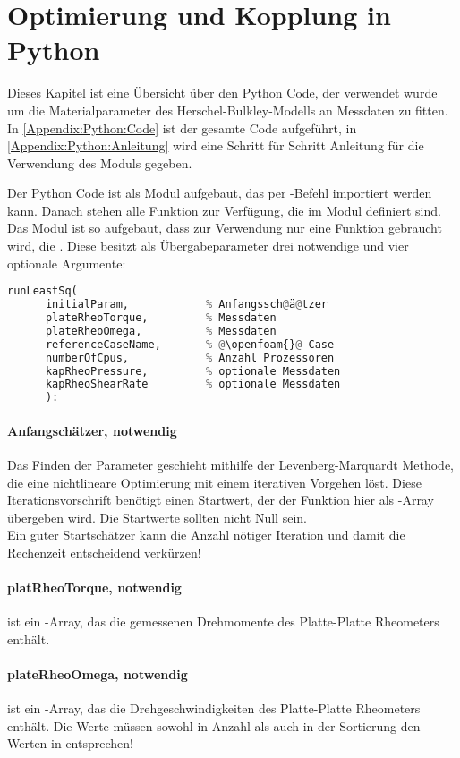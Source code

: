 \section{Optimierung und Kopplung in Python}
\label{Appendix:Python}
Dieses Kapitel ist eine Übersicht über den Python Code, der verwendet wurde um die Materialparameter des Herschel-Bulkley-Modells an Messdaten zu fitten.
In \ref{Appendix:Python:Code} ist der gesamte Code aufgeführt, in \ref{Appendix:Python:Anleitung} wird eine Schritt für Schritt Anleitung für die Verwendung des Moduls gegeben.

Der Python Code ist als Modul aufgebaut, das per -Befehl importiert werden kann.
Danach stehen alle Funktion zur Verfügung, die im Modul definiert sind.
Das Modul ist so aufgebaut, dass zur Verwendung nur eine Funktion gebraucht wird, die .
Diese besitzt als Übergabeparameter drei notwendige und vier optionale Argumente:
\begin{lstlisting}[language=Python]
runLeastSq(
      initialParam,            % Anfangssch@ä@tzer
      plateRheoTorque,         % Messdaten
      plateRheoOmega,          % Messdaten
      referenceCaseName,       % @\openfoam{}@ Case
      numberOfCpus,            % Anzahl Prozessoren
      kapRheoPressure,         % optionale Messdaten
      kapRheoShearRate         % optionale Messdaten
      ):  
\end{lstlisting}
\paragraph{Anfangschätzer, notwendig}
Das Finden der Parameter geschieht mithilfe der Levenberg-Marquardt Methode, die eine nichtlineare Optimierung mit einem iterativen Vorgehen löst. Diese Iterationsvorschrift benötigt einen Startwert, der der Funktion  hier als -Array übergeben wird. Die Startwerte sollten nicht Null sein.\\
Ein guter Startschätzer kann die Anzahl nötiger Iteration und damit die Rechenzeit entscheidend verkürzen!
%
\paragraph{platRheoTorque, notwendig}
 ist ein -Array, das die gemessenen Drehmomente des Platte-Platte Rheometers enthält.
%
\paragraph{plateRheoOmega, notwendig}
 ist ein -Array, das die Drehgeschwindigkeiten des Platte-Platte Rheometers enthält. Die Werte müssen sowohl in Anzahl als auch in der Sortierung den Werten in  entsprechen!
